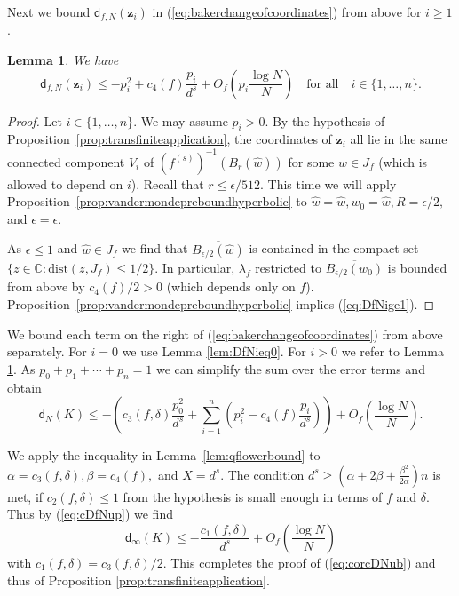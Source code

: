 \documentclass[12pt,oneside,a4]{amsart}
\newcommand{\IC}{\mathbb{C}}
\newcounter{maincounter}
\numberwithin{maincounter}{section}
\numberwithin{equation}{section}
\newtheorem{lemma}[maincounter]{Lemma}
\newcommand{\bfz}{\boldsymbol{z}}
\begin{document}
Next we bound $\mathsf{d}_{f,N}(\bfz_i)$ in
(\ref{eq:bakerchangeofcoordinates})
from above for $i\ge 1$.
\begin{lemma}
  \label{lem:DfNige1}
  We have
  \begin{equation}
    \label{eq:DfNige1}
    \mathsf{d}_{f,N}(\bfz_i) \le -p_i^2 + c_4(f)\frac{ p_i}{d^s}  +
    O_{f}\left(p_i\frac{\log N}{N}\right)
    \quad\text{for all}\quad i\in \{1,\ldots,n\}.    
  \end{equation}
\end{lemma}
\begin{proof}
  Let $i\in \{1,\ldots,n\}$. We may assume $p_i>0$. By the hypothesis 
  of Proposition~\ref{prop:transfiniteapplication}, the
  coordinates of $\bfz_i$ all lie in the
  same connected component $V_i$ of
  $(f^{(s)})^{-1}(B_{r}(\widehat w))$ for some $\widehat w\in J_f$
  (which is allowed to depend on $i$).
  Recall that $r \le \epsilon / 512$. 
  This time we will apply Proposition~\ref{prop:vandermondepreboundhyperbolic} to
  $\widehat w=\widehat w,w_0=\widehat w, R=\epsilon/2,$ and $\epsilon=\epsilon$.

  As $\epsilon \le 1$ and $\widehat w \in J_f$ we find that
  $\overline{B_{\epsilon/2}(\widehat w)}$ is contained in
  the compact set $\{z\in \IC : \mathrm{dist}(z,J_f)\le 1/2\}$.
  In particular, $\lambda_f$ restricted to
  $\overline{B_{\epsilon/2}(w_0)}$ is bounded from above by
  $c_4(f)/2>0$ (which depends only on $f$).
  Proposition~\ref{prop:vandermondepreboundhyperbolic} implies
  (\ref{eq:DfNige1}).
\end{proof}
We bound each term on the right of (\ref{eq:bakerchangeofcoordinates})
from above separately. For $i=0$ we use Lemma \ref{lem:DfNieq0}. For
$i>0$ we refer to Lemma \ref{lem:DfNige1}. As $p_0+p_1+\cdots+p_n=1$
we can simplify the sum over the error terms and obtain
\begin{equation}
  \label{eq:cDfNup}
    \mathsf{d}_N(K) \le - \left(c_3(f,\delta)\frac{p_0^2}{d^s}
  +\sum_{i=1}^n \left(p_i^2 -c_4(f)\frac{p_i}{d^s}\right)\right) +O_f\left(\frac{\log
      N}{N}\right). 
\end{equation}

We apply the inequality in Lemma~\ref{lem:qflowerbound} to $\alpha =
c_3(f,\delta),\beta = c_4(f),$ and $X = d^s$. The condition
 $d^s\ge (\alpha+2\beta+\frac{\beta^2}{2\alpha})n$
is met, if $c_2(f,\delta) \le 1$ from
the hypothesis is small enough in terms of $f$ and $\delta$. Thus by
(\ref{eq:cDfNup}) we find
\begin{equation*}
  \mathsf{d}_\infty(K) \le -\frac{c_1(f,\delta)}{d^s}  + O_f\left(\frac{\log N}{N}\right)
\end{equation*}
with $c_1(f,\delta)=c_3(f,\delta)/2$. This
completes the proof of (\ref{eq:corcDNub}) and thus of Proposition
\ref{prop:transfiniteapplication}.
\end{document}
